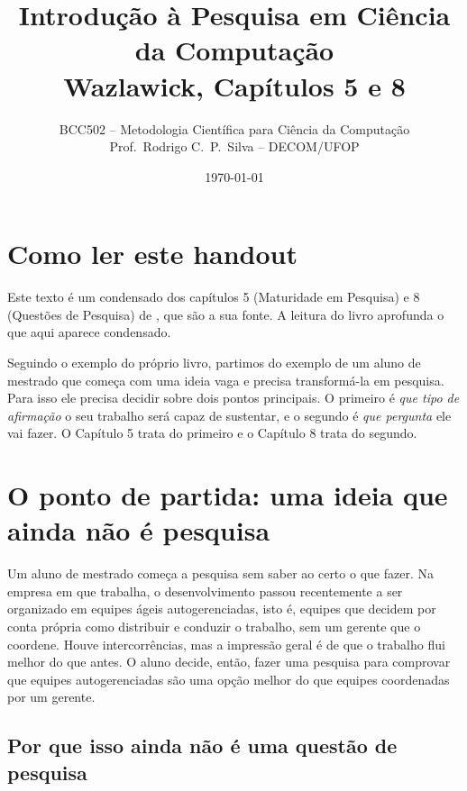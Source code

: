 \documentclass[10pt,a4paper]{extarticle}
\title{Introdução à Pesquisa em Ciência da Computação\\Wazlawick, Capítulos 5 e 8}
\author{BCC502 -- Metodologia Científica para Ciência da Computação\\Prof.\ Rodrigo C.\ P.\ Silva -- DECOM/UFOP}
\date{\today}
\theoremstyle{definition}
\begin{document}
\maketitle
\thispagestyle{fancy}
\tableofcontents

\section*{Como ler este handout}

Este texto é um condensado dos capítulos 5 (Maturidade em Pesquisa) e 8 (Questões de Pesquisa) de \cite{wazlawick2020}, que são a sua fonte. A leitura do livro aprofunda o que aqui aparece condensado. 

Seguindo o exemplo do próprio livro, partimos do exemplo de um aluno de mestrado que começa com uma ideia vaga e precisa transformá-la em pesquisa. Para isso ele precisa decidir sobre dois pontos principais. O primeiro é \emph{que tipo de afirmação} o seu trabalho será capaz de sustentar, e o segundo é \emph{que pergunta} ele vai fazer. O Capítulo 5 trata do primeiro e o Capítulo 8 trata do segundo. 

\section{O ponto de partida: uma ideia que ainda não é pesquisa}\label{sec:partida}

Um aluno de mestrado começa a pesquisa sem saber ao certo o que fazer. Na empresa em que trabalha, o desenvolvimento passou recentemente a ser organizado em equipes ágeis autogerenciadas, isto é, equipes que decidem por conta própria como distribuir e conduzir o trabalho, sem um gerente que o coordene. Houve intercorrências, mas a impressão geral é de que o trabalho flui melhor do que antes. O aluno decide, então, fazer uma pesquisa para comprovar que equipes autogerenciadas são uma opção melhor do que equipes coordenadas por um gerente.

\subsection{Por que isso ainda não é uma questão de pesquisa}
\end{document}
